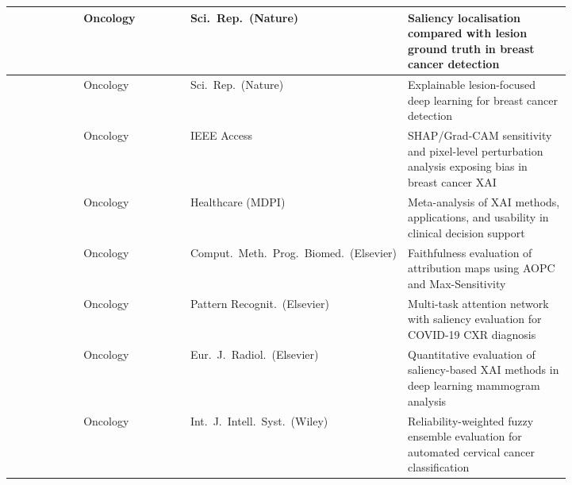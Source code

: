 \begin{longtable}{|>{\raggedright\arraybackslash}p{0.14\linewidth}|>{\raggedright\arraybackslash}p{0.20\linewidth}|>{\raggedright\arraybackslash}p{0.17\linewidth}|>{\raggedright\arraybackslash}p{0.31\linewidth}|}
\cite{Pertuz2023} & Oncology & Sci.\ Rep.\ (Nature) & Saliency localisation compared with lesion ground truth in breast cancer detection \\
\hline
\cite{saharan2025explainable} & Oncology & Sci.\ Rep.\ (Nature) & Explainable lesion-focused deep learning for breast cancer detection \\
\hline
\cite{11271656} & Oncology & IEEE Access & SHAP/Grad-CAM sensitivity and pixel-level perturbation analysis exposing bias in breast cancer XAI \\
\hline
\cite{abbas2025explainable} & Oncology & Healthcare (MDPI) & Meta-analysis of XAI methods, applications, and usability in clinical decision support \\
\hline
\cite{Patricio2024} & Oncology & Comput.\ Meth.\ Prog.\ Biomed.\ (Elsevier) & Faithfulness evaluation of attribution maps using AOPC and Max-Sensitivity \\
\hline
\cite{sharma2022covidmanet} & Oncology & Pattern Recognit.\ (Elsevier) & Multi-task attention network with saliency evaluation for COVID-19 CXR diagnosis \\
\hline
\cite{cerekci2024quantitative} & Oncology & Eur.\ J.\ Radiol.\ (Elsevier) & Quantitative evaluation of saliency-based XAI methods in deep learning mammogram analysis \\
\hline
\cite{alpsalaz2026explainability} & Oncology & Int.\ J.\ Intell.\ Syst.\ (Wiley) & Reliability-weighted fuzzy ensemble evaluation for automated cervical cancer classification \\
\hline


\end{longtable}

